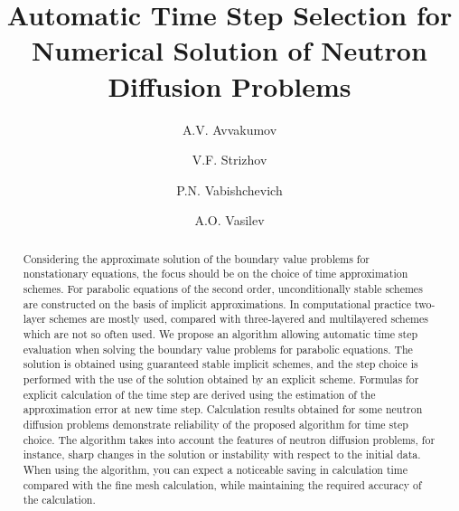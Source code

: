 \documentclass[runningheads]{llncs}
\begin{document}
%
\title{Automatic Time Step Selection for Numerical Solution of Neutron Diffusion Problems}
%
%
\author{A.V. Avvakumov \and
V.F. Strizhov\and
P.N. Vabishchevich\and
A.O. Vasilev}
%
%
%
\maketitle              %
%
\begin{abstract}
Considering the approximate solution of the boundary value problems for nonstationary equations, the focus should be on the choice of time approximation schemes. 
For parabolic equations of the second order, unconditionally stable schemes are constructed on the basis of implicit approximations.
In computational practice two-layer schemes are mostly used, compared with three-layered and multilayered schemes which are not so often used.
We propose an algorithm allowing automatic time step evaluation when solving the boundary value problems	for parabolic equations.
The solution is obtained using guaranteed stable implicit schemes, and the step choice is performed with the use of the solution obtained by an explicit scheme.
Formulas for explicit calculation of the time step are derived using the estimation of the approximation error at new time step.
Calculation results obtained for some neutron diffusion problems demonstrate reliability of the proposed algorithm for time step choice. The algorithm takes into account the features of neutron diffusion problems, for instance, sharp changes in the solution or instability with respect to the initial data. When using the algorithm, you can expect a noticeable saving in calculation time compared with the fine mesh calculation, while maintaining the required accuracy of the calculation.

\end{abstract}
\end{document}

